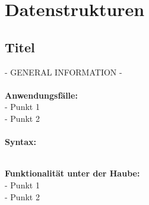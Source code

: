 \documentclass[../main.tex]{subfiles}
\begin{document}
	
	\section{Datenstrukturen}
%		 
	
		\subsection{Titel}
		- GENERAL INFORMATION -\\\\
		\textbf{Anwendungsfälle:}\\
		- Punkt 1\\
		- Punkt 2\\
		\\
		\textbf{Syntax:}
		 
		\\
		\textbf{Funktionalität unter der Haube:}\\
		- Punkt 1\\
		- Punkt 2\\
		\clearpage
\end{document}

